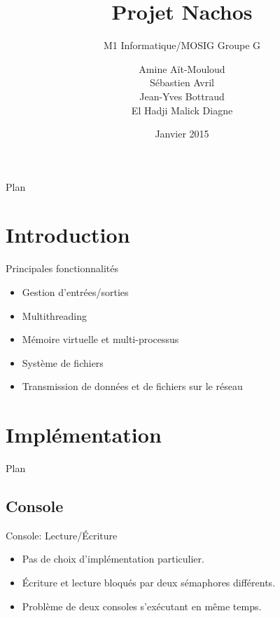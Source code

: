 \documentclass{beamer}
\title{Projet Nachos}
\subtitle{M1 Informatique/MOSIG \newline{}Groupe G}
\author{Amine Aït-Mouloud
\\ Sébastien Avril
\\ Jean-Yves Bottraud
\\ El Hadji Malick Diagne
}
\date{Janvier 2015}
\begin{document}

\begin{frame}{Plan}
    \tableofcontents
\end{frame}

\section{Introduction}
\begin{frame}{Principales fonctionnalités}
	\begin{itemize}
       \item Gestion d'entrées/sorties
       \item Multithreading
       \item Mémoire virtuelle et multi-processus
       \item Système de fichiers
       \item Transmission de données et de fichiers sur le réseau
   \end{itemize}
\end{frame}

\section{Implémentation}
\begin{frame}{Plan}
    \tableofcontents[currentsection]
\end{frame}

\subsection{Console}
\begin{frame}{Console: Lecture/Écriture}
   \begin{itemize}
       \item Pas de choix d'implémentation particulier.
       \item Écriture et lecture bloqués par deux sémaphores différents.
       \item Problème de deux consoles s’exécutant en même temps.
   \end{itemize}
\end{frame}
\end{document}
